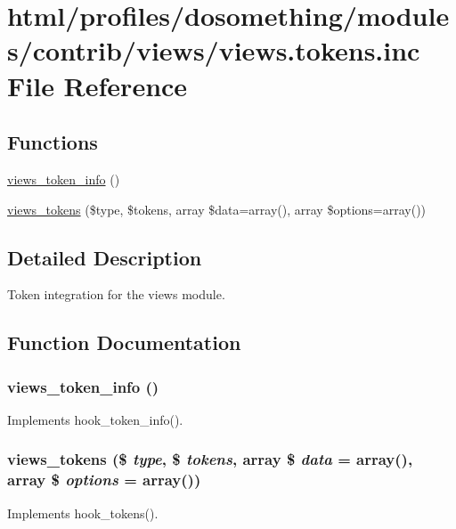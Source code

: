 \hypertarget{views_8tokens_8inc}{
\section{html/profiles/dosomething/modules/contrib/views/views.tokens.inc File Reference}
\label{views_8tokens_8inc}
}
\subsection*{Functions}
\begin{DoxyCompactItemize}
\item 
\hyperlink{views_8tokens_8inc_ac9aea2238db25b6e39017db05f5aab4c}{views\_\-token\_\-info} ()
\item 
\hyperlink{views_8tokens_8inc_a8741e4913d6047737eaf6108a2645f50}{views\_\-tokens} (\$type, \$tokens, array \$data=array(), array \$options=array())
\end{DoxyCompactItemize}


\subsection{Detailed Description}
Token integration for the views module. 

\subsection{Function Documentation}
\hypertarget{views_8tokens_8inc_ac9aea2238db25b6e39017db05f5aab4c}{
\subsubsection[{views\_\-token\_\-info}]{\setlength{\rightskip}{0pt plus 5cm}views\_\-token\_\-info ()}}
\label{views_8tokens_8inc_ac9aea2238db25b6e39017db05f5aab4c}
Implements hook\_\-token\_\-info(). \hypertarget{views_8tokens_8inc_a8741e4913d6047737eaf6108a2645f50}{
\subsubsection[{views\_\-tokens}]{\setlength{\rightskip}{0pt plus 5cm}views\_\-tokens (\$ {\em type}, \/  \$ {\em tokens}, \/  array \$ {\em data} = {\ttfamily array()}, \/  array \$ {\em options} = {\ttfamily array()})}}
\label{views_8tokens_8inc_a8741e4913d6047737eaf6108a2645f50}
Implements hook\_\-tokens(). 